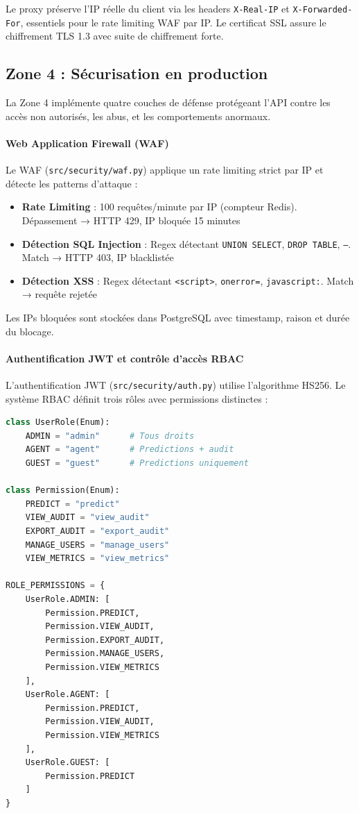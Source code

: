 Le proxy préserve l'IP réelle du client via les headers \texttt{X-Real-IP} et \texttt{X-Forwarded-For}, essentiels pour le rate limiting WAF par IP. Le certificat SSL assure le chiffrement TLS 1.3 avec suite de chiffrement forte.


\subsection{Zone 4 : Sécurisation en production}

La Zone 4 implémente quatre couches de défense protégeant l'API contre les accès non autorisés, les abus, et les comportements anormaux.

\paragraph{Web Application Firewall (WAF)}

Le WAF (\texttt{src/security/waf.py}) applique un rate limiting strict par IP et détecte les patterns d'attaque :

\begin{itemize}
    \item \textbf{Rate Limiting} : 100 requêtes/minute par IP (compteur Redis). Dépassement → HTTP 429, IP bloquée 15 minutes
    \item \textbf{Détection SQL Injection} : Regex détectant \texttt{UNION SELECT}, \texttt{DROP TABLE}, \texttt{--}. Match → HTTP 403, IP blacklistée
    \item \textbf{Détection XSS} : Regex détectant \texttt{<script>}, \texttt{onerror=}, \texttt{javascript:}. Match → requête rejetée
\end{itemize}

Les IPs bloquées sont stockées dans PostgreSQL avec timestamp, raison et durée du blocage.

\paragraph{Authentification JWT et contrôle d'accès RBAC}

L'authentification JWT (\texttt{src/security/auth.py}) utilise l'algorithme HS256. Le système RBAC définit trois rôles avec permissions distinctes :

\begin{lstlisting}[language=Python, caption=Définition des rôles et permissions]
class UserRole(Enum):
    ADMIN = "admin"      # Tous droits
    AGENT = "agent"      # Predictions + audit
    GUEST = "guest"      # Predictions uniquement

class Permission(Enum):
    PREDICT = "predict"
    VIEW_AUDIT = "view_audit"
    EXPORT_AUDIT = "export_audit"
    MANAGE_USERS = "manage_users"
    VIEW_METRICS = "view_metrics"

ROLE_PERMISSIONS = {
    UserRole.ADMIN: [
        Permission.PREDICT,
        Permission.VIEW_AUDIT,
        Permission.EXPORT_AUDIT,
        Permission.MANAGE_USERS,
        Permission.VIEW_METRICS
    ],
    UserRole.AGENT: [
        Permission.PREDICT,
        Permission.VIEW_AUDIT,
        Permission.VIEW_METRICS
    ],
    UserRole.GUEST: [
        Permission.PREDICT
    ]
}
\end{lstlisting}

